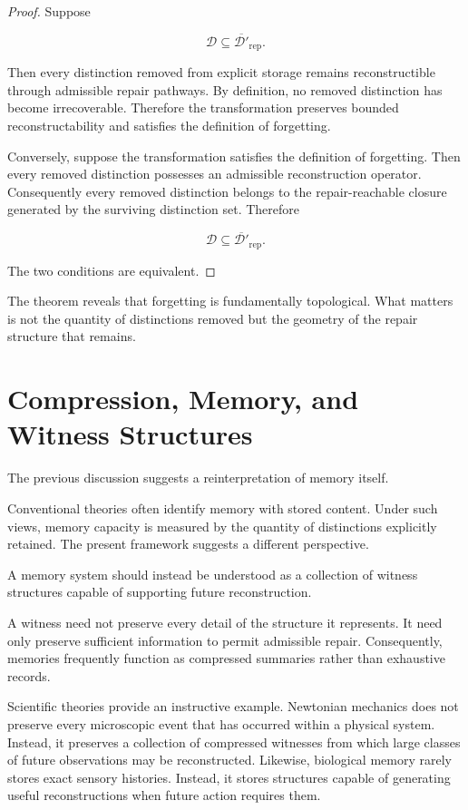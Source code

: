 \documentclass[12pt,oneside]{book}
\theoremstyle{plain} \newtheorem{theorem}{Theorem}[chapter] \newtheorem{lemma}[theorem]{Lemma} \newtheorem{proposition}[theorem]{Proposition} \newtheorem{corollary}[theorem]{Corollary}
\theoremstyle{definition} \newtheorem{definition}[theorem]{Definition} \newtheorem{axiom}[theorem]{Axiom} \newtheorem{construction}[theorem]{Construction}
\theoremstyle{remark} \newtheorem{remark}[theorem]{Remark} \newtheorem{example}[theorem]{Example}
\newcommand{\D}{\mathcal{D}} \newcommand{\R}{\mathcal{R}} \newcommand{\F}{\mathcal{F}} \newcommand{\U}{\mathcal{U}} \newcommand{\M}{\mathcal{M}} \newcommand{\G}{\Gamma}
\begin{document}
\begin{proof}

Suppose

\[
\D
\subseteq
\overline{\D'}_{\mathrm{rep}}.
\]

Then every distinction removed from explicit storage remains reconstructible through admissible repair pathways. By definition, no removed distinction has become irrecoverable. Therefore the transformation preserves bounded reconstructability and satisfies the definition of forgetting.

Conversely, suppose the transformation satisfies the definition of forgetting. Then every removed distinction possesses an admissible reconstruction operator. Consequently every removed distinction belongs to the repair-reachable closure generated by the surviving distinction set. Therefore

\[
\D
\subseteq
\overline{\D'}_{\mathrm{rep}}.
\]

The two conditions are equivalent.

\end{proof}

The theorem reveals that forgetting is fundamentally topological. What matters is not the quantity of distinctions removed but the geometry of the repair structure that remains.

\section{Compression, Memory, and Witness Structures}

The previous discussion suggests a reinterpretation of memory itself.

Conventional theories often identify memory with stored content. Under such views, memory capacity is measured by the quantity of distinctions explicitly retained. The present framework suggests a different perspective.

A memory system should instead be understood as a collection of witness structures capable of supporting future reconstruction.

A witness need not preserve every detail of the structure it represents. It need only preserve sufficient information to permit admissible repair. Consequently, memories frequently function as compressed summaries rather than exhaustive records.

Scientific theories provide an instructive example. Newtonian mechanics does not preserve every microscopic event that has occurred within a physical system. Instead, it preserves a collection of compressed witnesses from which large classes of future observations may be reconstructed. Likewise, biological memory rarely stores exact sensory histories. Instead, it stores structures capable of generating useful reconstructions when future action requires them.
\end{document}
